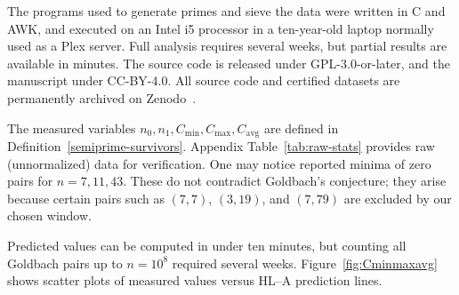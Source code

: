 \documentclass[11pt]{article}
\theoremstyle{inline}
\theoremstyle{break}
\theoremstyle{break}
\theoremstyle{break}
\theoremstyle{break}
\theoremstyle{break}
\theoremstyle{break}
\theoremstyle{break}
\theoremstyle{inline}
\newcommand{\tavg}{{\scriptscriptstyle\mathrm{avg}}}
\newcommand{\Cmeas}{C}              %
\newcommand{\Nmeas}{n}              %
\begin{document}
The programs used to generate primes and sieve the data were written in C and AWK, and executed on an Intel i5 processor in a ten-year-old laptop normally used as a Plex server.  Full analysis requires several weeks, but partial results are available in minutes.  The source code is released under GPL-3.0-or-later, and the manuscript under CC-BY-4.0.  All source code and certified datasets are permanently archived on Zenodo~\cite{Riemers2025SieveGoldbach}.

The measured variables \( \Nmeas_0, \Nmeas_1, \Cmeas_{\min}, \Cmeas_{\max}, \Cmeas_{\tavg} \) are defined in Definition~\ref{semiprime-survivors}. Appendix Table~\ref{tab:raw-stats} provides raw (unnormalized) data for verification. One may notice reported minima of zero pairs for \( n=7,11,43 \). These do not contradict Goldbach’s conjecture; they arise because certain pairs such as \( (7,7) \), \( (3,19) \), and \( (7,79) \) are excluded by our chosen window.

Predicted values can be computed in under ten minutes, but counting all Goldbach pairs up to \( n=10^8 \) required several weeks. Figure~\ref{fig:Cminmaxavg} shows scatter plots of measured values versus HL–A prediction lines.

\pairdata
\end{document}
